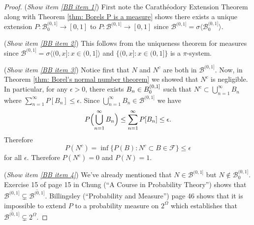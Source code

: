 \begin{proof}
({\sl Show item \ref{BB item 1}}) First note the Carath\'eodory Extension Theorem  along with Theorem \ref{thm: Borels P is a measure} shows there exists a unique extension $P:\mathcal B_0^{(0,1]}\rightarrow [0,1]$ to $P:\mathcal B^{(0,1]}\rightarrow [0,1]$ since $\mathcal B^{(0,1]}=\sigma\bigl\langle \mathcal B_0^{(0,1]} \bigr\rangle$.

({\sl Show item \ref{BB item 2}}) This follows from the uniqueness theorem for measures since $\mathcal B^{(0,1]} = \sigma\langle  (0,x]\colon x\in (0,1]\rangle$ and $\{(0,x]\colon x\in (0,1] \}$ is a $\pi$-system.


({\sl Show item \ref{BB item 3}})
Notice first that $N$ and $N^c$ are both in $\mathcal B^{(0,1]}$.
Now, in Theorem \ref{thm: Borel's normal number theorem} we showed that $N^c$ is negligible. In particular, for any $\epsilon >0$, there exists $B_n\in \mathcal \mathcal B_0^{(0,1]}$ such that $N^c\subset \bigcup_{n=1}^\infty B_n$ where  $\sum_{n=1}^\infty P[B_n]\leq \epsilon$. Since  $\bigcup_{n=1}^\infty B_n\in \mathcal B^{(0,1]} $ we have
\[P\Bigl(\bigcup_{n=1}^\infty B_n\Bigr)\leq \sum_{n=1}^\infty P[B_n]\leq \epsilon. \]
Therefore
\[P(N^c)= \inf\{P(B)\colon N^c\subset B\in \mathcal F  \}\leq \epsilon  \]
for all $\epsilon$. Therefore $P(N^c)=0$ and $P(N)=1$.


({\sl Show item \ref{BB item 4}}) We've already mentioned that $N\in \mathcal B^{(0,1]}$ but $N\notin \mathcal B_0^{(0,1]}$. Exercise 15 of page 15 in Chung (``A Course in Probability Theory'') shows that $\mathcal B^{(0,1]} \subsetneq  \overline{\mathcal B^{(0,1]}}$. Billingsley (``Probability and Measure'') page 46 shows that it is impossible to extend $P$ to a probability measure on $2^\Omega$ which establishes that $ \overline{\mathcal B^{(0,1]}}\subsetneq 2^\Omega$.

\end{proof}





